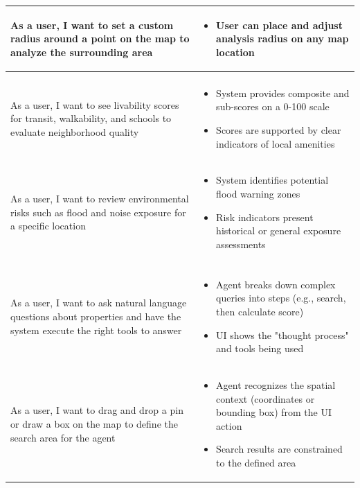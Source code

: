 \begin{longtable}{>{\raggedright\arraybackslash}p{}>{\raggedright\arraybackslash}p{}}
	As a user, I want to set a custom radius around a point on the map to analyze the surrounding area &
	\begin{itemize}
	\item User can place and adjust analysis radius on any map location
	\end{itemize} \\
	\midrule
	\multicolumn{2}{l}{\textbf{Location Intelligence \& Livability Analysis}} \\
	\midrule
	As a user, I want to see livability scores for transit, walkability, and schools to evaluate neighborhood quality &
	\begin{itemize}
	\item System provides composite and sub-scores on a 0-100 scale
	\item Scores are supported by clear indicators of local amenities
	\end{itemize} \\
	
	\rowcolor[gray]{0.95}
	As a user, I want to review environmental risks such as flood and noise exposure for a specific location &
	\begin{itemize}
	\item System identifies potential flood warning zones
	\item Risk indicators present historical or general exposure assessments
	\end{itemize} \\

	\midrule
	\multicolumn{2}{l}{\textbf{Borbann AI Agent}} \\
	\midrule
	As a user, I want to ask natural language questions about properties and have the system execute the right tools to answer &
	\begin{itemize}
	\item Agent breaks down complex queries into steps (e.g., search, then calculate score)
	\item UI shows the "thought process" and tools being used
	\end{itemize} \\
	
	\rowcolor[gray]{0.95}
	As a user, I want to drag and drop a pin or draw a box on the map to define the search area for the agent &
	\begin{itemize}
	\item Agent recognizes the spatial context (coordinates or bounding box) from the UI action
	\item Search results are constrained to the defined area
	\end{itemize} \\
	
\end{longtable}

